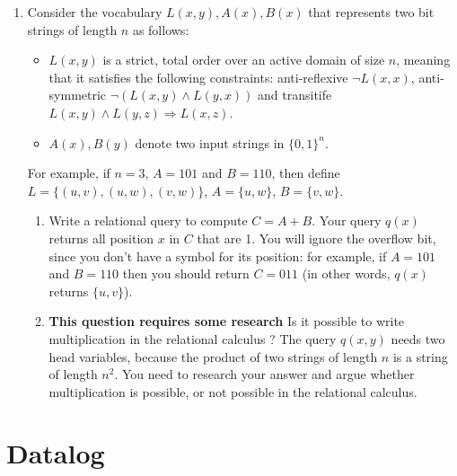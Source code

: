 \documentclass[12pt]{article}
\newcounter{query}
\newcommand{\set}[1]{\{#1\}}                    %
\begin{document}
\begin{enumerate}
\item Consider the vocabulary $L(x,y), A(x), B(x)$ that represents two
  bit strings of length $n$ as follows:
  \begin{itemize}
  \item $L(x,y)$ is a strict, total order over an active domain of
    size $n$, meaning that it satisfies the following constraints:
    anti-reflexive $\neg L(x,x)$, anti-symmetric $\neg (L(x,y) \wedge
    L(y,x))$ and transitife $L(x,y)\wedge L(y,z) \Rightarrow L(x,z)$.
  \item $A(x),B(y)$ denote two input strings in $\set{0,1}^n$.
  \end{itemize}
  For example, if $n=3$, $A = 101$ and $B=110$, then define $L =
  \set{(u,v), (u,w), (v,w)}$, $A = \set{u,w}$, $B = \set{v,w}$.
  \begin{enumerate}
  \item Write a relational query to compute $C = A + B$.  Your query
    $q(x)$ returns all position $x$ in $C$ that are 1.  You will
    ignore the overflow bit, since you don't have a symbol for its
    position: for example, if $A = 101$ and $B= 110$ then you should
    return $C= 011$ (in other words, $q(x)$ returns $\set{u,v}$).
  \item {\bf This question requires some research} Is it possible to
    write multiplication in the relational calculus ?  The query
    $q(x,y)$ needs two head variables, because the product of two
    strings of length $n$ is a string of length $n^2$.  You need to
    research your answer and argue whether multiplication is possible,
    or not possible in the relational calculus.
  \end{enumerate}
  \end{enumerate}

\section{Datalog}
\end{document}
